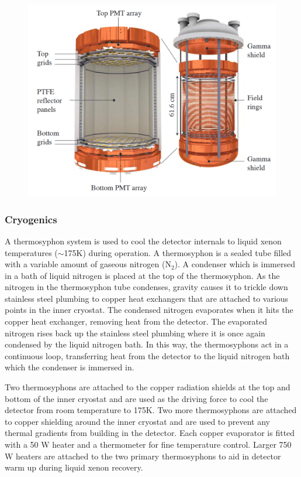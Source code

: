  \begin{figure} [!h]
\includegraphics[scale=.45]{LuxFieldCage.png} 
\label{LuxFieldCage}
\end{figure}


\subsubsection{Cryogenics}

A thermosyphon system is used to cool the detector internals to liquid xenon temperatures  ($\sim$175K) during operation. A thermosyphon is a sealed tube filled with a variable amount of gaseous nitrogen (N$_2$).  A condenser which is immersed in a bath of liquid nitrogen is placed at the top of the thermosyphon.  As the nitrogen in the thermosyphon tube condenses, gravity causes it to trickle down stainless steel plumbing to copper heat exchangers that are attached to various points in the inner cryostat.  The condensed nitrogen evaporates when it hits the copper heat exchanger, removing heat from the detector.  The evaporated nitrogen rises back up the stainless steel plumbing where it is once again condensed by the liquid nitrogen bath.  In this way, the thermosyphons act in a continuous loop, transferring heat from the detector to the liquid nitrogen bath which the condenser is immersed in.

Two thermosyphons are attached to the copper radiation shields at the top and bottom of the inner cryostat and are used as the driving force to cool the detector from room temperature to 175K. Two more thermosyphons are attached to copper shielding around the inner cryostat and are used to prevent any thermal gradients from building in the detector.  Each copper evaporator is fitted with a 50 W heater and a thermometer for fine temperature control.  Larger 750 W heaters are attached to the two primary thermosyphons to aid in detector warm up during liquid xenon recovery.

